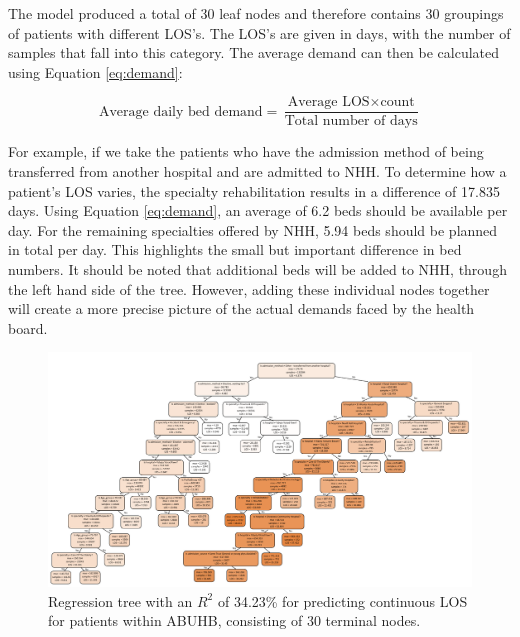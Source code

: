 \documentclass[../thesis.tex]{subfiles}
\begin{document}
The model produced a total of 30 leaf nodes and therefore contains 30 groupings of patients with different LOS's. The LOS's are given in days, with the number of samples that fall into this category. The average demand can then be calculated using Equation \eqref{eq:demand}:

\begin{equation}\label{eq:demand}
    \text{Average daily bed demand} = \frac{\text{Average LOS} \times \text{count}}{\text{Total number of days}}
\end{equation}

For example, if we take the patients who have the admission method of being transferred from another hospital and are admitted to NHH. To determine how a patient's LOS varies, the specialty rehabilitation results in a difference of 17.835 days. Using Equation \eqref{eq:demand}, an average of 6.2 beds should be available per day. For the remaining specialties offered by NHH, 5.94 beds should be planned in total per day. This highlights the small but important difference in bed numbers. It should be noted that additional beds will be added to NHH, through the left hand side of the tree. However, adding these individual nodes together will create a more precise picture of the actual demands faced by the health board.


\begin{landscape}
    \begin{figure}[h!]
        \centering
    \includegraphics[scale=0.72]{Chapters/Chapter5/Figuresnew/CorrectionsRegressionTree.pdf}
        \caption{Regression tree with an $R^{2}$ of 34.23\% for predicting continuous LOS for patients within ABUHB, consisting of 30 terminal nodes.}
        \label{fig:finalregtree}
    \end{figure}
\end{landscape}
\end{document}
